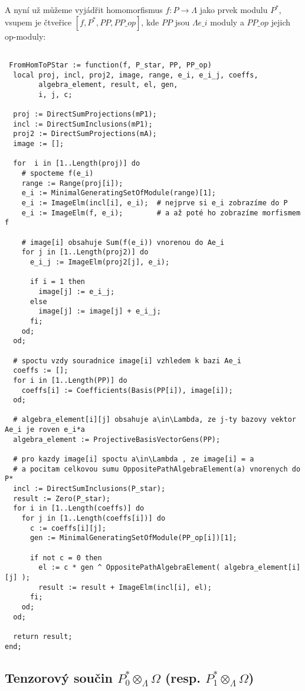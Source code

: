\documentclass[7pt]{article}
\begin{document}
         A nyní už můžeme vyjádřit homomorfismus $f:P \rightarrow \Lambda$ jako 
         prvek modulu $P^*$, vsupem je čtveřice $[f, P^*, PP, PP\_op]$, kde $PP$ 
         jsou $\Lambda e\_i$ moduly a $PP\_op$ jejich op-moduly:
         
         
       \begin{verbatim}
                  
 FromHomToPStar := function(f, P_star, PP, PP_op)
  local proj, incl, proj2, image, range, e_i, e_i_j, coeffs, 
        algebra_element, result, el, gen,
        i, j, c;

  proj := DirectSumProjections(mP1);
  incl := DirectSumInclusions(mP1);
  proj2 := DirectSumProjections(mA);
  image := [];

  for  i in [1..Length(proj)] do
    # spocteme f(e_i)
    range := Range(proj[i]);
    e_i := MinimalGeneratingSetOfModule(range)[1];
    e_i := ImageElm(incl[i], e_i);  # nejprve si e_i zobrazíme do P
    e_i := ImageElm(f, e_i);        # a až poté ho zobrazíme morfismem f

    # image[i] obsahuje Sum(f(e_i)) vnorenou do Ae_i
    for j in [1..Length(proj2)] do
      e_i_j := ImageElm(proj2[j], e_i);

      if i = 1 then
        image[j] := e_i_j;
      else
        image[j] := image[j] + e_i_j;
      fi;
    od;
  od;

  # spoctu vzdy souradnice image[i] vzhledem k bazi Ae_i
  coeffs := [];
  for i in [1..Length(PP)] do
    coeffs[i] := Coefficients(Basis(PP[i]), image[i]);
  od;

  # algebra_element[i][j] obsahuje a\in\Lambda, ze j-ty bazovy vektor Ae_i je roven e_i*a
  algebra_element := ProjectiveBasisVectorGens(PP);

  # pro kazdy image[i] spoctu a\in\Lambda , ze image[i] = a
  # a pocitam celkovou sumu OppositePathAlgebraElement(a) vnorenych do P*
  incl := DirectSumInclusions(P_star);
  result := Zero(P_star);
  for i in [1..Length(coeffs)] do
    for j in [1..Length(coeffs[i])] do
      c := coeffs[i][j];
      gen := MinimalGeneratingSetOfModule(PP_op[i])[1];

      if not c = 0 then
        el := c * gen ^ OppositePathAlgebraElement( algebra_element[i][j] );
        result := result + ImageElm(incl[i], el);
      fi;
    od;
  od;

  return result;
end;        
       \end{verbatim}


    \subsection{Tenzorový součin $P^*_0\otimes_\Lambda\Omega$ (resp. $P^*_1\otimes_\Lambda\Omega$)}
\end{document}
